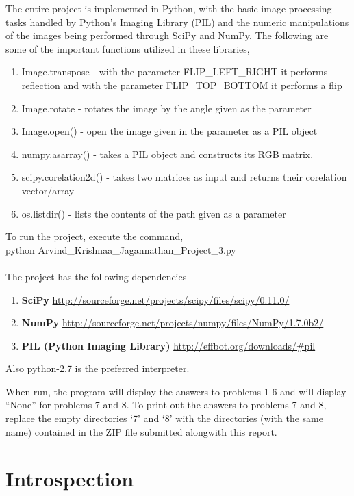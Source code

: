 \documentclass[10pt, letter]{article}
\begin{document}
The entire project is implemented in Python, with the basic image processing tasks handled by Python's Imaging Library (PIL) and the numeric manipulations of the images being performed through SciPy and NumPy. The following are some of the important functions utilized in these libraries,
\begin{enumerate}
	\item Image.transpose - with the parameter FLIP\_LEFT\_RIGHT it performs reflection and with the parameter FLIP\_TOP\_BOTTOM it performs a flip
	\item Image.rotate - rotates the image by the angle given as the parameter
	\item Image.open() - open the image given in the parameter as a PIL object
	\item numpy.asarray() - takes a PIL object and constructs its RGB matrix.
	\item scipy.corelation2d() - takes two matrices as input and returns their corelation vector/array
	\item os.listdir() - lists the contents of the path given as a parameter
\end{enumerate}
To run the project, execute the command, \\
	\hspace*{3cm} python Arvind\_Krishnaa\_Jagannathan\_Project\_3.py \\ \\
The project has the following dependencies
\begin{enumerate}
\item \textbf{SciPy}	\url{http://sourceforge.net/projects/scipy/files/scipy/0.11.0/}
\item \textbf{NumPy}	\url{http://sourceforge.net/projects/numpy/files/NumPy/1.7.0b2/}
\item \textbf{PIL (Python Imaging Library)}	\url{http://effbot.org/downloads/\#pil}
\end{enumerate}
Also python-2.7 is the preferred interpreter.

When run, the program will display the answers to problems 1-6 and will display ``None'' for problems 7 and 8. To print out the answers to problems 7 and 8, replace the empty directories `7' and `8' with the directories (with the same name) contained in the ZIP file submitted alongwith this report.

\section{Introspection}
\end{document}
